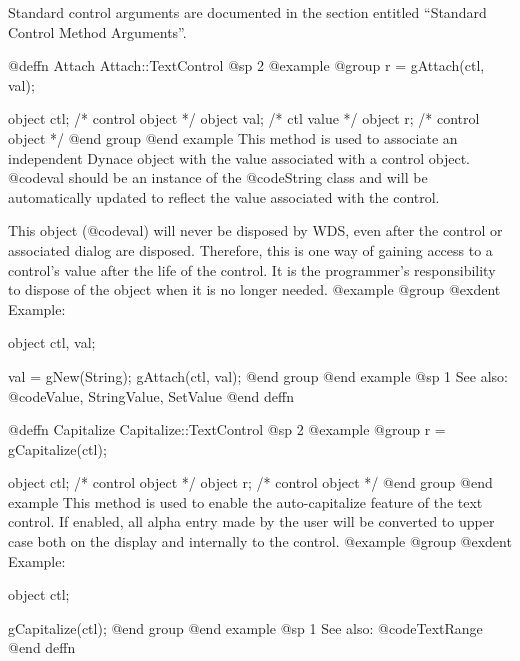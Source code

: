 Standard control arguments are documented in the section entitled
``Standard Control Method Arguments''.












@deffn {Attach} Attach::TextControl
@sp 2
@example
@group
r = gAttach(ctl, val);

object  ctl;   /*  control object  */
object  val;   /*  ctl value       */
object  r;     /*  control object  */
@end group
@end example
This method is used to associate an independent Dynace object with the
value associated with a control object.  @code{val} should be an
instance of the @code{String} class and will be automatically updated
to reflect the value associated with the control.

This object (@code{val}) will never be disposed by WDS, even after
the control or associated dialog are disposed.  Therefore, this
is one way of gaining access to a control's value after the life
of the control.  It is the programmer's responsibility to dispose of
the object when it is no longer needed.
@example
@group
@exdent Example:

object  ctl, val;

val = gNew(String);
gAttach(ctl, val);
@end group
@end example
@sp 1
See also:  @code{Value, StringValue, SetValue}
@end deffn












@deffn {Capitalize} Capitalize::TextControl
@sp 2
@example
@group
r = gCapitalize(ctl);

object  ctl;   /*  control object  */
object  r;     /*  control object  */
@end group
@end example
This method is used to enable the auto-capitalize feature of the text
control.  If enabled, all alpha entry made by the user will be converted
to upper case both on the display and internally to the control.
@example
@group
@exdent Example:

object  ctl;

gCapitalize(ctl);
@end group
@end example
@sp 1
See also:  @code{TextRange}
@end deffn













